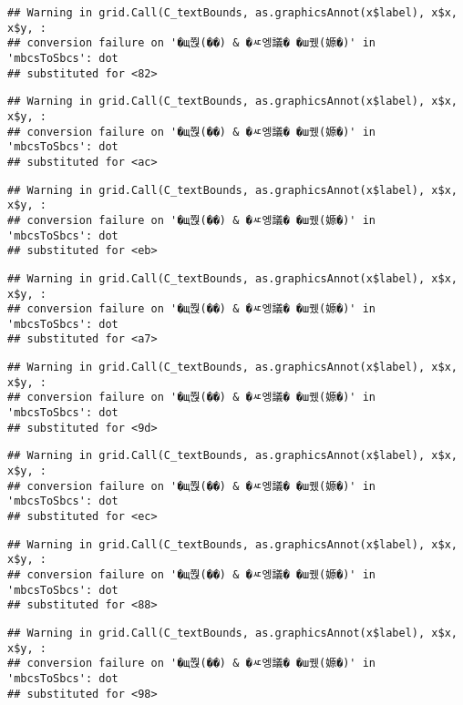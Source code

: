 \documentclass[
]{article}
\begin{document}
\begin{verbatim}
## Warning in grid.Call(C_textBounds, as.graphicsAnnot(x$label), x$x, x$y, :
## conversion failure on '�щ쭩(��) & �ㅼ엥議� �ш퀬(嫄�)' in 'mbcsToSbcs': dot
## substituted for <82>
\end{verbatim}

\begin{verbatim}
## Warning in grid.Call(C_textBounds, as.graphicsAnnot(x$label), x$x, x$y, :
## conversion failure on '�щ쭩(��) & �ㅼ엥議� �ш퀬(嫄�)' in 'mbcsToSbcs': dot
## substituted for <ac>
\end{verbatim}

\begin{verbatim}
## Warning in grid.Call(C_textBounds, as.graphicsAnnot(x$label), x$x, x$y, :
## conversion failure on '�щ쭩(��) & �ㅼ엥議� �ш퀬(嫄�)' in 'mbcsToSbcs': dot
## substituted for <eb>
\end{verbatim}

\begin{verbatim}
## Warning in grid.Call(C_textBounds, as.graphicsAnnot(x$label), x$x, x$y, :
## conversion failure on '�щ쭩(��) & �ㅼ엥議� �ш퀬(嫄�)' in 'mbcsToSbcs': dot
## substituted for <a7>
\end{verbatim}

\begin{verbatim}
## Warning in grid.Call(C_textBounds, as.graphicsAnnot(x$label), x$x, x$y, :
## conversion failure on '�щ쭩(��) & �ㅼ엥議� �ш퀬(嫄�)' in 'mbcsToSbcs': dot
## substituted for <9d>
\end{verbatim}

\begin{verbatim}
## Warning in grid.Call(C_textBounds, as.graphicsAnnot(x$label), x$x, x$y, :
## conversion failure on '�щ쭩(��) & �ㅼ엥議� �ш퀬(嫄�)' in 'mbcsToSbcs': dot
## substituted for <ec>
\end{verbatim}

\begin{verbatim}
## Warning in grid.Call(C_textBounds, as.graphicsAnnot(x$label), x$x, x$y, :
## conversion failure on '�щ쭩(��) & �ㅼ엥議� �ш퀬(嫄�)' in 'mbcsToSbcs': dot
## substituted for <88>
\end{verbatim}

\begin{verbatim}
## Warning in grid.Call(C_textBounds, as.graphicsAnnot(x$label), x$x, x$y, :
## conversion failure on '�щ쭩(��) & �ㅼ엥議� �ш퀬(嫄�)' in 'mbcsToSbcs': dot
## substituted for <98>
\end{verbatim}
\end{document}
